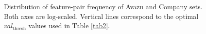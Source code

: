\begin{figure}
	\centering
	\caption{Distribution of feature-pair frequency of Avazu and Company sets. Both axes are log-scaled. Vertical lines correspond to the optimal $val_{\text{thresh}}$ values used in Table \ref{tab2}.}
	\label{fig.2}
\end{figure}
